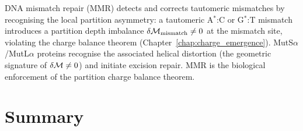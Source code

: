 \begin{proposition}
\label{prop:mismatch_repair}
DNA mismatch repair (MMR) detects and corrects tautomeric mismatches by
recognising the local partition asymmetry: a tautomeric A$^*$:C or G$^*$:T
mismatch introduces a partition depth imbalance
$\delta\mathcal{M}_{\mathrm{mismatch}} \neq 0$ at the mismatch site, violating
the charge balance theorem (Chapter~\ref{chap:charge_emergence}).
MutS$\alpha$/MutL$\alpha$ proteins recognise the associated helical distortion
(the geometric signature of $\delta\mathcal{M} \neq 0$) and initiate excision repair.
MMR is the biological enforcement of the partition charge balance theorem.
\end{proposition}

\section{Summary}
\label{sec:hydrogen_bonds_summary}

